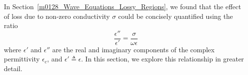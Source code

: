 

\label{m0132_Loss_Tangent} %

In Section~\ref{m0128_Wave_Equations_Lossy_Regions}, we found that the effect of loss due to non-zero conductivity $\sigma$ could be concisely quantified using the ratio 
%
\begin{equation}
\frac{\epsilon''}{\epsilon'} = \frac{\sigma}{\omega\epsilon}
\label{m0132_eratio}
\end{equation}
%
where $\epsilon'$ and $\epsilon''$ are the real and imaginary components of the complex permittivity $\epsilon_c$, and $\epsilon'\triangleq\epsilon$.  In this section, we explore this relationship in greater detail.

